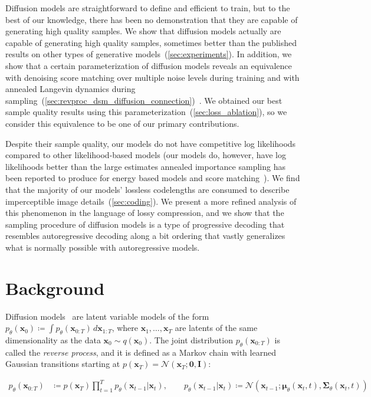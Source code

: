 Diffusion models are straightforward to define and efficient to train, but to the best of our knowledge, there has been no demonstration that they are capable of generating high quality samples. We show that diffusion models actually are capable of generating high quality samples, sometimes better than the published results on other types of generative models~(\ref{sec:experiments}).
In addition, we show that a certain parameterization of diffusion models reveals an equivalence with denoising score matching over multiple noise levels during training and with annealed Langevin dynamics during sampling~(\ref{sec:revproc_dsm_diffusion_connection})~\citep{song2019generative,vincent2011connection}. 
We obtained our best sample quality results using this parameterization~(\ref{sec:loss_ablation}), so we consider this equivalence to be one of our primary contributions.

Despite their sample quality, our models do not have competitive log likelihoods compared to other likelihood-based models (our models do, however, have log likelihoods better than the large estimates annealed importance sampling has been reported to produce for energy based models and score matching~\citep{du2019implicit,song2019generative}). We find that the majority of our models' lossless codelengths  are consumed to describe imperceptible image details~(\ref{sec:coding}). We present a more refined analysis of this phenomenon in the language of lossy compression, and we show that the sampling procedure of diffusion models is a type of progressive decoding that resembles autoregressive decoding along a bit ordering that vastly generalizes what is normally possible with autoregressive models.

\section{Background}
Diffusion models~\citep{sohl2015deep} are latent variable models of the form $p_\theta(\mathbf{x}_0) \coloneqq \int p_\theta(\mathbf{x}_{0:T}) \,d\mathbf{x}_{1:T}$, where $\mathbf{x}_1, \dotsc, \mathbf{x}_T$ are latents of the same dimensionality as the data $\mathbf{x}_0 \sim q(\mathbf{x}_0)$. The joint distribution $p_\theta(\mathbf{x}_{0:T})$ is called the \emph{reverse process}, and it is defined as a Markov chain with learned Gaussian transitions starting at $p(\mathbf{x}_T)=\mathcal{N}(\mathbf{x}_T; \mathbf{0}, \mathbf{I})$:

\begin{align}
  p_\theta(\mathbf{x}_{0:T}) &\coloneqq p(\mathbf{x}_T)\prod_{t=1}^T p_\theta(\mathbf{x}_{t-1}|\mathbf{x}_t), \qquad 
  p_\theta(\mathbf{x}_{t-1}|\mathbf{x}_t) \coloneqq \mathcal{N}(\mathbf{x}_{t-1}; {\boldsymbol{\mu}}_\theta(\mathbf{x}_t, t), {\boldsymbol{\Sigma}}_\theta(\mathbf{x}_t, t))
\end{align}

